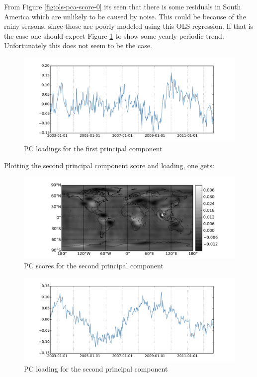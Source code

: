 From Figure \ref{fig:ols-pca-score-0} its seen that there is some residuals in South America which are unlikely to be caused by noise. This could be because of the rainy seasons, since those are poorly modeled using this OLS regression. If that is the case one should expect Figure \ref{fig:ols-pca-loading-0} to show some yearly periodic trend. Unfortunately this does not seem to be the case.

\begin{figure}[H]
\centering
\includegraphics[width=1.0\textwidth]{figures/ols-pca-loading-0}
\caption{PC loadings for the first principal component}
\label{fig:ols-pca-loading-0}
\end{figure}

Plotting the second principal component score and loading, one gets:
\begin{figure}[H]
\centering
\includegraphics[width=1.0\textwidth]{figures/ols-pca-score-1}
\caption{PC scores for the second principal component}
\label{fig:ols-pca-score-1}
\end{figure}

\begin{figure}[H]
\centering
\includegraphics[width=1.0\textwidth]{figures/ols-pca-loading-1}
\caption{PC loading for the second principal component}
\label{fig:ols-pca-loading-1}
\end{figure}

